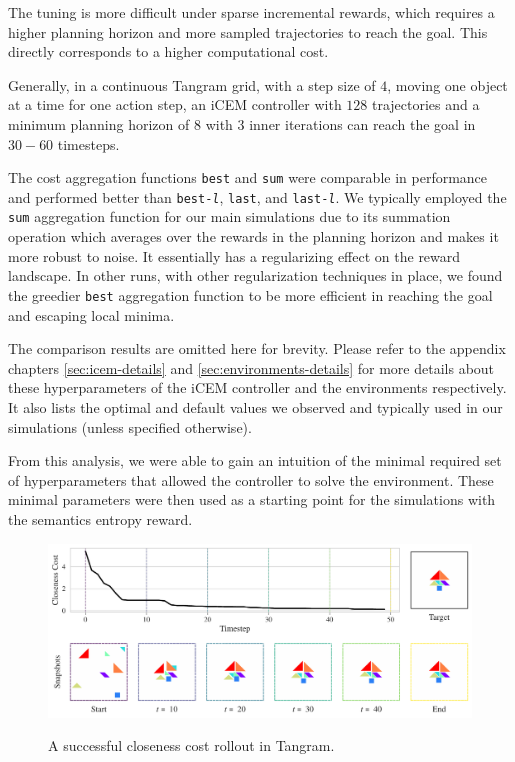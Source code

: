 The tuning is more difficult under sparse incremental rewards, which requires a higher planning horizon and more sampled trajectories to reach the goal.
This directly corresponds to a higher computational cost.

Generally, in a continuous Tangram grid, with a step size of \(4\), moving one object at a time for one action step, an iCEM controller with \(128\) trajectories and a minimum planning horizon of \(8\) with \(3\) inner iterations can reach the goal in \(30-60\) timesteps.

The cost aggregation functions \texttt{best} and \texttt{sum} were comparable in performance and performed better than \texttt{best-\emph{l}}, \texttt{last}, and \texttt{last-\emph{l}}.
We typically employed the \texttt{sum} aggregation function for our main simulations due to its summation operation which averages over the rewards in the planning horizon and makes it more robust to noise.
It essentially has a regularizing effect on the reward landscape.
In other runs, with other regularization techniques in place, we found the greedier \texttt{best} aggregation function to be more efficient in reaching the goal and escaping local minima.

The comparison results are omitted here for brevity. Please refer to the appendix chapters \ref{sec:icem-details} and \ref{sec:environments-details} for more details about these hyperparameters of the iCEM controller and the environments respectively. It also lists the optimal and default values we observed and typically used in our simulations (unless specified otherwise).

From this analysis, we were able to gain an intuition of the minimal required set of hyperparameters that allowed the controller to solve the environment.
These minimal parameters were then used as a starting point for the simulations with the semantics entropy reward.

\begin{figure}[H]
    \centering
    \href{https://drive.google.com/file/d/15IAo_xsNFSUI0YFVjrIBfn7LAV2hO68E}{\includegraphics[width=\textwidth]{images/closeness_trajectory_495.pdf}}
    \caption[A successful closeness cost rollout in Tangram.]{A successful closeness cost rollout in Tangram\footnotemark[1].}
    \label{fig:closeness-rollouts}
\end{figure}


